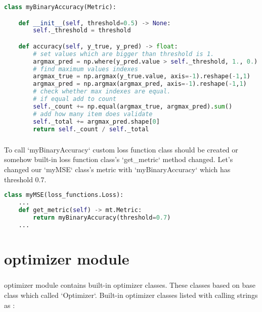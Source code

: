 \documentclass[12pt]{report}
\begin{document}
\begin{lstlisting}[language=Python, numbers=none, caption={Custom metric classes.}, label={lis:metric-custom-class}]
class myBinaryAccuracy(Metric):

	def __init__(self, threshold=0.5) -> None: 
		self._threshold = threshold

	def accuracy(self, y_true, y_pred) -> float:
		# set values which are bigger than threshold is 1.
		argmax_pred = np.where(y_pred.value > self._threshold, 1., 0.)
		# find maximum values indexes
		argmax_true = np.argmax(y_true.value, axis=-1).reshape(-1,1)
		argmax_pred = np.argmax(argmax_pred, axis=-1).reshape(-1,1)
		# check whether max indexes are equal. 
		# if equal add to count
		self._count += np.equal(argmax_true, argmax_pred).sum()
		# add how many item does validate
		self._total += argmax_pred.shape[0]
		return self._count / self._total   

\end{lstlisting}

\paragraph{}
To call `myBinaryAccuracy` custom loss function class should be created or somehow built-in loss function class's `get\_metric` method changed. Let's changed our `myMSE` class's metric with `myBinaryAccuracy` which has threshold 0.7.

\begin{lstlisting}[language=Python, numbers=none, caption={Calling custom metric class.}, label={lis:metric-binary-custom-class}]
class myMSE(loss_functions.Loss):
	...
	def get_metric(self) -> mt.Metric:
		return myBinaryAccuracy(threshold=0.7)
	...

\end{lstlisting}






\chapter{optimizer module}
\label{ch:optimizer}

\paragraph{}
optimizer module contains built-in optimizer classes. These classes based on base class which called `Optimizer`. Built-in optimizer classes listed with calling strings as : 
\end{document}
